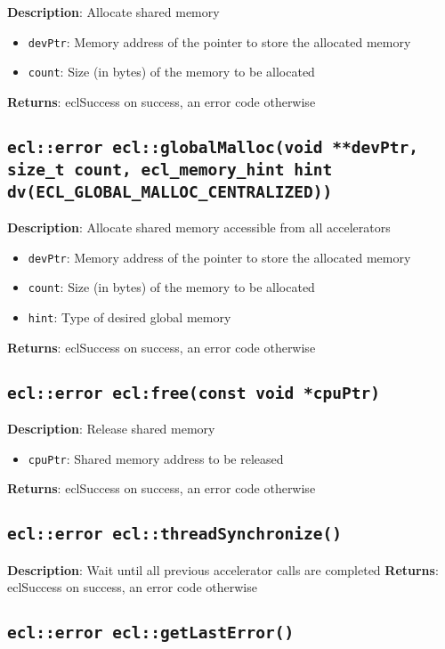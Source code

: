 \textbf{Description}: Allocate shared memory
\begin{itemize}
  \item \texttt{devPtr}: Memory address of the pointer to store the allocated memory
  \item \texttt{count}: Size (in bytes) of the memory to be allocated
\end{itemize}
\textbf{Returns}: eclSuccess on success, an error code otherwise

\subsection{\texttt{ecl::error ecl::globalMalloc(void **devPtr, size\_t count, ecl\_memory\_hint 
hint dv(ECL\_GLOBAL\_MALLOC\_CENTRALIZED))}}

\textbf{Description}: Allocate shared memory accessible from all accelerators
\begin{itemize}
  \item \texttt{devPtr}: Memory address of the pointer to store the allocated memory
  \item \texttt{count}: Size (in bytes) of the memory to be allocated
  \item \texttt{hint}: Type of desired global memory
\end{itemize}
\textbf{Returns}: eclSuccess on success, an error code otherwise

\subsection{\texttt{ecl::error ecl:free(const void *cpuPtr)}}

\textbf{Description}: Release shared memory
\begin{itemize}
  \item \texttt{cpuPtr}: Shared memory address to be released
\end{itemize}
\textbf{Returns}: eclSuccess on success, an error code otherwise

\subsection{\texttt{ecl::error ecl::threadSynchronize()}}

\textbf{Description}: Wait until all previous accelerator calls are completed
\textbf{Returns}: eclSuccess on success, an error code otherwise

\subsection{\texttt{ecl::error ecl::getLastError()}}

